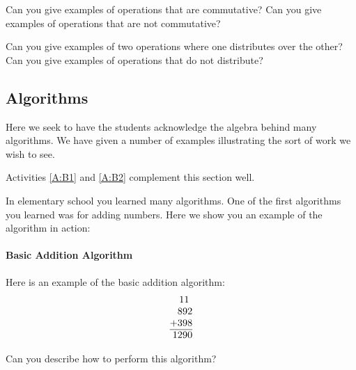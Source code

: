 \begin{question}
Can you give examples of operations that are commutative? Can you give
examples of operations that are not commutative?
\end{question}
\QM


\begin{question}
Can you give examples of two operations where one distributes over the
other? Can you give examples of operations that do not distribute?
\end{question}
\QM



\subsection{Algorithms}

\begin{teachingnote}
Here we seek to have the students acknowledge the algebra behind many
algorithms. We have given a number of examples illustrating the sort
of work we wish to see.
\end{teachingnote}


\begin{activitynote}
Activities \ref{A:B1} and \ref{A:B2} complement  this section well.  %
\end{activitynote}


In elementary school you learned many algorithms. One of the first
algorithms you learned was for adding numbers. Here we show you an
example of the algorithm in action:




\paragraph{Basic Addition Algorithm}
Here is an example of the basic addition algorithm:
\[
\begin{tabular}{@{}r@{}}
11~~\\
892\\
+398\\ \hline
1290
\end{tabular}
\]

\begin{question}
Can you describe how to perform this algorithm?
\end{question}

